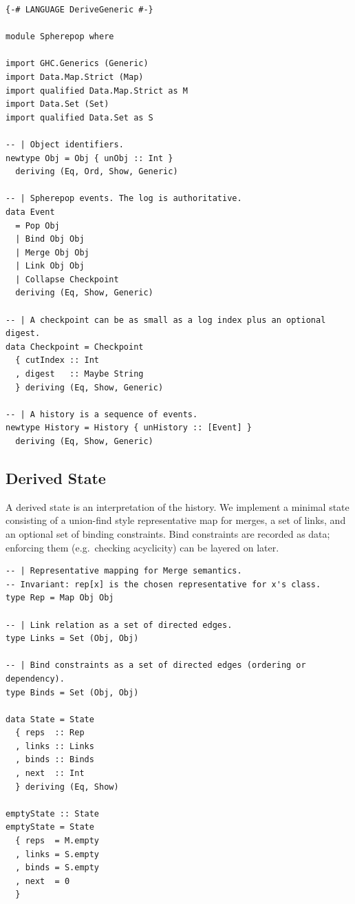 \documentclass[11pt]{article}
\begin{document}
\begin{verbatim}
{-# LANGUAGE DeriveGeneric #-}

module Spherepop where

import GHC.Generics (Generic)
import Data.Map.Strict (Map)
import qualified Data.Map.Strict as M
import Data.Set (Set)
import qualified Data.Set as S

-- | Object identifiers.
newtype Obj = Obj { unObj :: Int }
  deriving (Eq, Ord, Show, Generic)

-- | Spherepop events. The log is authoritative.
data Event
  = Pop Obj
  | Bind Obj Obj
  | Merge Obj Obj
  | Link Obj Obj
  | Collapse Checkpoint
  deriving (Eq, Show, Generic)

-- | A checkpoint can be as small as a log index plus an optional digest.
data Checkpoint = Checkpoint
  { cutIndex :: Int
  , digest   :: Maybe String
  } deriving (Eq, Show, Generic)

-- | A history is a sequence of events.
newtype History = History { unHistory :: [Event] }
  deriving (Eq, Show, Generic)
\end{verbatim}

\subsection{Derived State}

A derived state is an interpretation of the history. We implement a minimal
state consisting of a union-find style representative map for merges, a set of
links, and an optional set of binding constraints. Bind constraints are recorded
as data; enforcing them (e.g.\ checking acyclicity) can be layered on later.

\begin{verbatim}
-- | Representative mapping for Merge semantics.
-- Invariant: rep[x] is the chosen representative for x's class.
type Rep = Map Obj Obj

-- | Link relation as a set of directed edges.
type Links = Set (Obj, Obj)

-- | Bind constraints as a set of directed edges (ordering or dependency).
type Binds = Set (Obj, Obj)

data State = State
  { reps  :: Rep
  , links :: Links
  , binds :: Binds
  , next  :: Int
  } deriving (Eq, Show)

emptyState :: State
emptyState = State
  { reps  = M.empty
  , links = S.empty
  , binds = S.empty
  , next  = 0
  }
\end{verbatim}
\end{document}
